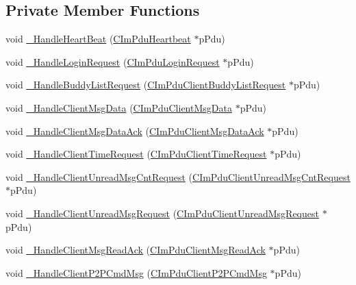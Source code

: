 \subsection*{Private Member Functions}
\begin{DoxyCompactItemize}
\item 
void \hyperlink{class_c_msg_conn_a130f1ec0881be11d4617e735aec229db}{\+\_\+\+Handle\+Heart\+Beat} (\hyperlink{class_c_im_pdu_heartbeat}{C\+Im\+Pdu\+Heartbeat} $\ast$p\+Pdu)
\item 
void \hyperlink{class_c_msg_conn_a621d5f40ac5b76857bc21a5d4d46186d}{\+\_\+\+Handle\+Login\+Request} (\hyperlink{class_c_im_pdu_login_request}{C\+Im\+Pdu\+Login\+Request} $\ast$p\+Pdu)
\item 
void \hyperlink{class_c_msg_conn_ad189e103f03873290532a8757c6e7824}{\+\_\+\+Handle\+Buddy\+List\+Request} (\hyperlink{class_c_im_pdu_client_buddy_list_request}{C\+Im\+Pdu\+Client\+Buddy\+List\+Request} $\ast$p\+Pdu)
\item 
void \hyperlink{class_c_msg_conn_ae3300f12b797fb3c232cde7228872ad7}{\+\_\+\+Handle\+Client\+Msg\+Data} (\hyperlink{class_c_im_pdu_client_msg_data}{C\+Im\+Pdu\+Client\+Msg\+Data} $\ast$p\+Pdu)
\item 
void \hyperlink{class_c_msg_conn_a5e621fe4ed151bd017b42fe1ea5dd569}{\+\_\+\+Handle\+Client\+Msg\+Data\+Ack} (\hyperlink{class_c_im_pdu_client_msg_data_ack}{C\+Im\+Pdu\+Client\+Msg\+Data\+Ack} $\ast$p\+Pdu)
\item 
void \hyperlink{class_c_msg_conn_a65a7394ed2680a47ee5ad6850dff33d2}{\+\_\+\+Handle\+Client\+Time\+Request} (\hyperlink{class_c_im_pdu_client_time_request}{C\+Im\+Pdu\+Client\+Time\+Request} $\ast$p\+Pdu)
\item 
void \hyperlink{class_c_msg_conn_a234ecfe27bd1fd66d1f28f5ff935e4d8}{\+\_\+\+Handle\+Client\+Unread\+Msg\+Cnt\+Request} (\hyperlink{class_c_im_pdu_client_unread_msg_cnt_request}{C\+Im\+Pdu\+Client\+Unread\+Msg\+Cnt\+Request} $\ast$p\+Pdu)
\item 
void \hyperlink{class_c_msg_conn_ac46225298df9cabe81e5f27a8ac082b4}{\+\_\+\+Handle\+Client\+Unread\+Msg\+Request} (\hyperlink{class_c_im_pdu_client_unread_msg_request}{C\+Im\+Pdu\+Client\+Unread\+Msg\+Request} $\ast$p\+Pdu)
\item 
void \hyperlink{class_c_msg_conn_ad4c90d8a58c5a0e5900ff77635b29dd8}{\+\_\+\+Handle\+Client\+Msg\+Read\+Ack} (\hyperlink{class_c_im_pdu_client_msg_read_ack}{C\+Im\+Pdu\+Client\+Msg\+Read\+Ack} $\ast$p\+Pdu)
\item 
void \hyperlink{class_c_msg_conn_aa747436fd5e946cc79b760931619448f}{\+\_\+\+Handle\+Client\+P2\+P\+Cmd\+Msg} (\hyperlink{class_c_im_pdu_client_p2_p_cmd_msg}{C\+Im\+Pdu\+Client\+P2\+P\+Cmd\+Msg} $\ast$p\+Pdu)

\end{DoxyCompactItemize}
